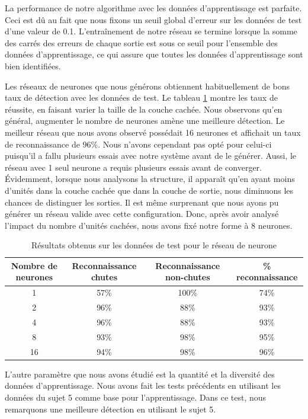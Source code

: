 \documentclass[12pt,letterpaper]{article}
\begin{document}
La performance de notre algorithme avec les données d'apprentissage est parfaite. Ceci est dû au fait que nous fixons un seuil global d'erreur sur les données de test d'une valeur de 0.1. L'entraînement de notre réseau se termine lorsque la somme des carrés des erreurs de chaque sortie est sous ce seuil pour l'ensemble des données d'apprentissage, ce qui assure que toutes les données d'apprentissage sont bien identifiées.

Les réseaux de neurones que nous générons obtiennent habituellement de bons taux de détection avec les données de test. Le tableau \ref{tbl:neural_results} montre les taux de réussite, en faisant varier la taille de la couche cachée. Nous observons qu'en général, augmenter le nombre de neurones amène une meilleure détection. Le meilleur réseau que nous avons observé possédait 16 neurones et affichait un taux de reconnaissance de 96\%. Nous n'avons cependant pas opté pour celui-ci puisqu'il a fallu plusieurs essais avec notre système avant de le générer. Aussi, le réseau avec 1 seul neurone a requis plusieurs essais avant de converger. Évidemment, lorsque nous analysons la structure, il apparaît qu'en ayant moins d'unités dans la couche cachée que dans la couche de sortie, nous diminuons les chances de distinguer les sorties. Il est même surprenant que nous ayons pu générer un réseau valide avec cette configuration. Donc, après avoir analysé l'impact du nombre d'unités cachées, nous avons fixé notre forme à 8 neurones.
\begin{table}
\centering
\begin{tabular}{|c|c|c|c|}
    \hline
    Nombre de neurones & Reconnaissance chutes & Reconnaissance non-chutes & \% reconnaissance \\ \hline
    1 & 57\% & 100\% & 74\%  \\ \hline
    2 & 96\%  & 88\% & 93\% \\ \hline
    4 & 96\% & 88\% & 93\% \\ \hline
    8 & 93\% & 98\% & 95\% \\ \hline
    16 & 94\% & 98\% & 96\% \\ \hline
\end{tabular}
\caption{Résultats obtenus sur les données de test pour le réseau de neurone}
\label{tbl:neural_results}
\end{table}

L'autre paramètre que nous avons étudié est la quantité et la diversité des données d'apprentissage. Nous avons fait les tests précédents en utilisant les données du sujet 5 comme base pour l'apprentissage. Dans ce test, nous remarquons une meilleure détection en utilisant le sujet 5.
\end{document}
